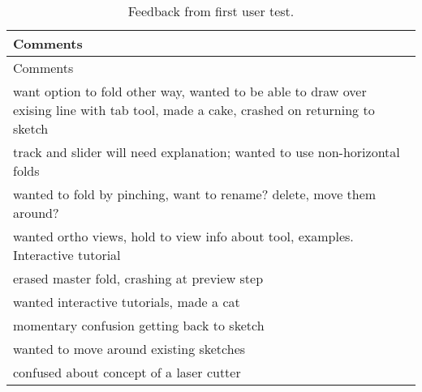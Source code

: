 \begin{longtable}[c]{@{}l@{}}
\caption{Feedback from first user test.}\tabularnewline
\toprule
\begin{minipage}[b]{0.82\columnwidth}\raggedright\strut
Comments
\strut\end{minipage}\tabularnewline
\midrule
\endfirsthead
\toprule
\begin{minipage}[b]{0.82\columnwidth}\raggedright\strut
Comments
\strut\end{minipage}\tabularnewline
\midrule
\endhead
\begin{minipage}[t]{0.82\columnwidth}\raggedright\strut
want option to fold other way, wanted to be able to draw over exising
line with tab tool, made a cake, crashed on returning to sketch
\strut\end{minipage}\tabularnewline
\begin{minipage}[t]{0.82\columnwidth}\raggedright\strut
track and slider will need explanation; wanted to use non-horizontal
folds
\strut\end{minipage}\tabularnewline
\begin{minipage}[t]{0.82\columnwidth}\raggedright\strut
wanted to fold by pinching, want to rename? delete, move them around?
\strut\end{minipage}\tabularnewline
\begin{minipage}[t]{0.82\columnwidth}\raggedright\strut
wanted ortho views, hold to view info about tool, examples. Interactive
tutorial
\strut\end{minipage}\tabularnewline
\begin{minipage}[t]{0.82\columnwidth}\raggedright\strut
erased master fold, crashing at preview step
\strut\end{minipage}\tabularnewline
\begin{minipage}[t]{0.82\columnwidth}\raggedright\strut
wanted interactive tutorials, made a cat
\strut\end{minipage}\tabularnewline
\begin{minipage}[t]{0.82\columnwidth}\raggedright\strut
momentary confusion getting back to sketch
\strut\end{minipage}\tabularnewline
\begin{minipage}[t]{0.82\columnwidth}\raggedright\strut
wanted to move around existing sketches
\strut\end{minipage}\tabularnewline
\begin{minipage}[t]{0.82\columnwidth}\raggedright\strut
confused about concept of a laser cutter
\strut\end{minipage}\tabularnewline

\end{longtable}
